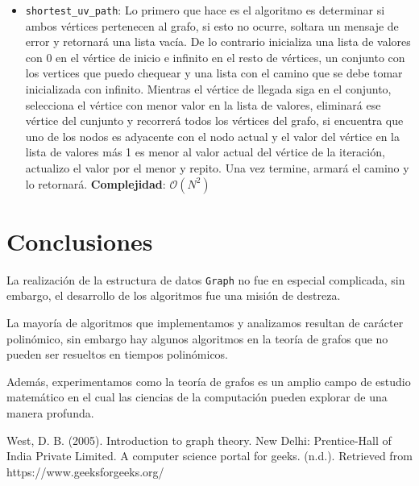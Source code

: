 \documentclass[conference]{IEEEtran}
\begin{document}
\begin{itemize}
\item \texttt{shortest\_uv\_path}: Lo primero que hace es el algoritmo es determinar si ambos vértices pertenecen al grafo, si esto no ocurre, soltara un mensaje de error y retornará una lista vacía. De lo contrario inicializa una lista de valores con 0 en el vértice de inicio e infinito en el resto de vértices, un conjunto con los vertices que puedo chequear y una lista con el camino que se debe tomar inicializada con infinito. Mientras el vértice de llegada siga en el conjunto, selecciona el vértice con menor valor en la lista de valores, eliminará ese vértice del cunjunto y recorrerá todos los vértices del grafo, si encuentra que uno de los nodos es adyacente con el nodo actual y el valor del vértice en la lista de valores más 1 es menor al valor actual del vértice de la iteración, actualizo el valor por el menor y repito. Una vez termine, armará el camino y lo retornará. \textbf{Complejidad}: $\mathcal{O}(N^2)$
\end{itemize}
\section{Conclusiones}

La realización de la estructura de datos \texttt{Graph} no fue en especial complicada, sin embargo, el desarrollo de los algoritmos fue una misión de destreza.

La mayoría de algoritmos que implementamos y analizamos resultan de carácter polinómico, sin embargo hay algunos algoritmos en la teoría de grafos que no pueden ser resueltos en tiempos polinómicos. 

Además, experimentamos como la teoría de grafos es un amplio campo de estudio matemático en el cual las ciencias de la computación pueden explorar de una manera profunda.

\begin{thebibliography}{00}
 West, D. B. (2005). Introduction to graph theory. New Delhi: Prentice-Hall of India Private Limited. 
 A computer science portal for geeks. (n.d.). Retrieved from https://www.geeksforgeeks.org/ 
\end{thebibliography}
\vspace{12pt}
\color{red}
\end{document}
